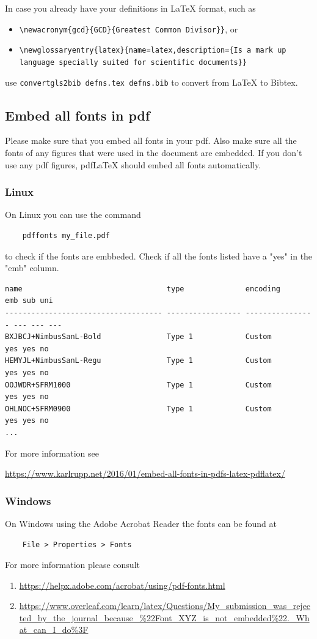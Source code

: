 In case you already have your definitions in \LaTeX{} format, such as
\begin{itemize}
	\item \verb|\newacronym{gcd}{GCD}{Greatest Common Divisor}}|, or
	\item \verb|\newglossaryentry{latex}{name=latex,description={Is a mark up language specially suited for scientific documents}}|
\end{itemize}
use \verb|convertgls2bib defns.tex defns.bib| to convert from \LaTeX{} to Bibtex.

\subsection{Embed all fonts in pdf}
Please make sure that you embed all fonts in your pdf. Also make sure all the fonts of any figures that were used in the document are embedded. 
If you don't use any pdf figures, pdfLaTeX should embed all fonts automatically.

\subsubsection{Linux}
On Linux you can use the command \begin{verbatim}
	pdffonts my_file.pdf
\end{verbatim}
to check if the fonts are embbeded. Check if all the fonts listed have a "yes" in the "emb" column. 
\begin{verbatim}
name                                 type              encoding         emb sub uni 
------------------------------------ ----------------- ---------------- --- --- --- 
BXJBCJ+NimbusSanL-Bold               Type 1            Custom           yes yes no     
HEMYJL+NimbusSanL-Regu               Type 1            Custom           yes yes no     
OOJWDR+SFRM1000                      Type 1            Custom           yes yes no      
OHLNOC+SFRM0900                      Type 1            Custom           yes yes no   
...
\end{verbatim}
For more information see 

\url{https://www.karlrupp.net/2016/01/embed-all-fonts-in-pdfs-latex-pdflatex/}
\subsubsection{Windows}
On Windows using the Adobe Acrobat Reader the fonts can be found at
\begin{verbatim}
	File > Properties > Fonts
\end{verbatim}
For more information please consult
\begin{enumerate}
	\item \url{https://helpx.adobe.com/acrobat/using/pdf-fonts.html}
	
	\item \url{https://www.overleaf.com/learn/latex/Questions/My_submission_was_rejected_by_the_journal_because_%22Font_XYZ_is_not_embedded%22._What_can_I_do%3F} 
	\end{enumerate}
	
